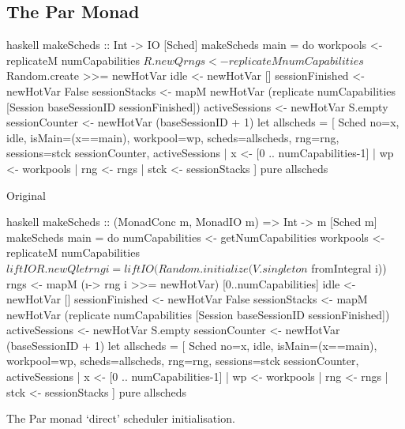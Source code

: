 \FloatBarrier

\subsection{The Par Monad}

\begin{listing}
  \begin{sublisting}{\textwidth}
    \centering
    \begin{cminted}{haskell}
makeScheds :: Int -> IO [Sched]
makeScheds main = do
   workpools <- replicateM numCapabilities $ R.newQ
   rngs <- replicateM numCapabilities $ Random.create >>= newHotVar
   idle <- newHotVar []
   sessionFinished <- newHotVar False
   sessionStacks   <- mapM newHotVar
     (replicate numCapabilities [Session baseSessionID sessionFinished])
   activeSessions  <- newHotVar S.empty
   sessionCounter  <- newHotVar (baseSessionID + 1)
   let allscheds = [ Sched { no=x, idle, isMain=(x==main), workpool=wp,
                             scheds=allscheds, rng=rng, sessions=stck
                             sessionCounter, activeSessions
                           }
                   | x   <- [0 .. numCapabilities-1]
                   | wp  <- workpools
                   | rng <- rngs
                   | stck <- sessionStacks
                   ]
   pure allscheds
    \end{cminted}
    \caption{Original}\label{lst:example-parmonad-sched-orig}
  \end{sublisting}

  \vspace{2.5em}

  \begin{sublisting}{\textwidth}
    \centering
    \begin{cminted}{haskell}
makeScheds :: (MonadConc m, MonadIO m) => Int -> m [Sched m]
makeScheds main = do
   numCapabilities <- getNumCapabilities
   workpools <- replicateM numCapabilities $ liftIO R.newQ
   let rng i = liftIO (Random.initialize (V.singleton $ fromIntegral i))
   rngs <- mapM (\i -> rng i >>= newHotVar) [0..numCapabilities]
   idle <- newHotVar []
   sessionFinished <- newHotVar False
   sessionStacks   <- mapM newHotVar
     (replicate numCapabilities [Session baseSessionID sessionFinished])
   activeSessions  <- newHotVar S.empty
   sessionCounter  <- newHotVar (baseSessionID + 1)
   let allscheds = [ Sched { no=x, idle, isMain=(x==main), workpool=wp,
                             scheds=allscheds, rng=rng, sessions=stck
                             sessionCounter, activeSessions
                           }
                   | x   <- [0 .. numCapabilities-1]
                   | wp  <- workpools
                   | rng <- rngs
                   | stck <- sessionStacks
                   ]
   pure allscheds
    \end{cminted}
    \caption{\dejafu{}}\label{lst:example-parmonad-sched-dejafu}
  \end{sublisting}
  \caption{The Par monad `direct' scheduler initialisation.}\label{lst:example-parmonad-sched}
\end{listing}

